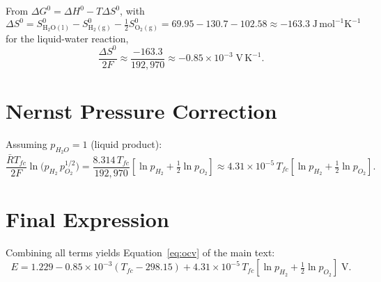 From $\Delta G^0=\Delta H^0-T\Delta S^0$, with
\[
    \Delta S^0 = S^0_{\mathrm{H_2O(l)}} - S^0_{\mathrm{H_2(g)}}
               - \tfrac{1}{2}S^0_{\mathrm{O_2(g)}}
              = 69.95-130.7-102.58 \approx -163.3\;\mathrm{J\,mol^{-1}K^{-1}}
\]
for the liquid-water reaction,
\[
    \frac{\Delta S^0}{2F}\approx\frac{-163.3}{192{,}970}
    \approx -0.85\times10^{-3}\;\mathrm{V\,K^{-1}}.
\]

\section*{Nernst Pressure Correction}

Assuming $p_{H_2O}=1$ (liquid product):
\[
    \frac{\bar{R}T_{fc}}{2F}\ln\!\bigl(p_{H_2}\,p_{O_2}^{1/2}\bigr)
    = \frac{8.314\,T_{fc}}{192{,}970}
      \left[\ln p_{H_2}+\tfrac{1}{2}\ln p_{O_2}\right]
    \approx 4.31\times10^{-5}\,T_{fc}
      \left[\ln p_{H_2}+\tfrac{1}{2}\ln p_{O_2}\right].
\]

\section*{Final Expression}

Combining all terms yields Equation~\eqref{eq:ocv} of the main text:
\[
    E = 1.229 - 0.85\times10^{-3}(T_{fc}-298.15)
          + 4.31\times10^{-5}\,T_{fc}\!\left[\ln p_{H_2}+\tfrac{1}{2}\ln p_{O_2}\right]\;\text{V}.
\]
